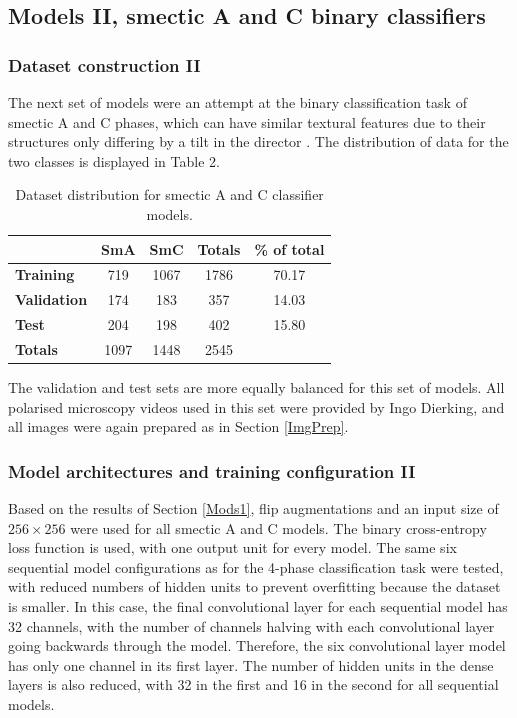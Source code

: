 \documentclass[12pt]{article}
\begin{document}
\subsection{Models II, smectic A and C binary classifiers}
\subsubsection{Dataset construction II}
The next set of models were an attempt at the binary classification task of smectic A and C phases, which can have similar textural features due to their structures only differing by a tilt in the director \cite{Dierking03}. The distribution of data for the two classes is displayed in Table 2.
\begin{table}[!htb]
\begin{center}
\caption{Dataset distribution for smectic A and C classifier models.}
\begin{tabular}{l|c|c|c|c}
\toprule
& \textbf{SmA} & \textbf{SmC} & \textbf{Totals} & \textbf{\% of total}\\
\midrule
\textbf{Training} & 719 & 1067 & 1786 & 70.17\\
\textbf{Validation} & 174 & 183 & 357 & 14.03\\
\textbf{Test} & 204 & 198 & 402 & 15.80\\
\midrule
\textbf{Totals} & 1097 & 1448 & 2545\\
\bottomrule
\end{tabular}
\end{center}
\end{table}
The validation and test sets are more equally balanced for this set of models. All polarised microscopy videos used in this set were provided by Ingo Dierking, and all images were again prepared as in Section \ref{ImgPrep}.
\subsubsection{Model architectures and training configuration II}
\label{Arch2}
Based on the results of Section \ref{Mods1}, flip augmentations and an input size of $256 \times 256$ were used for all smectic A and C models. The binary cross-entropy loss function is used, with one output unit for every model. The same six sequential model configurations as for the 4-phase classification task were tested, with reduced numbers of hidden units to prevent overfitting because the dataset is smaller. In this case, the final convolutional layer for each sequential model has 32 channels, with the number of channels halving with each convolutional layer going backwards through the model. Therefore, the six convolutional layer model has only one channel in its first layer. The number of hidden units in the dense layers is also reduced, with 32 in the first and 16 in the second for all sequential models.
\end{document}
